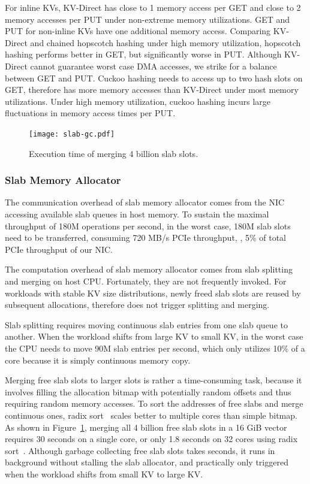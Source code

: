 For inline KVs, KV-Direct has close to 1 memory access per GET and close to 2 memory accesses per PUT under non-extreme memory utilizations.
GET and PUT for non-inline KVs have one additional memory access.
Comparing KV-Direct and chained hopscotch hashing under high memory utilization, hopscotch hashing performs better in GET, but significantly worse in PUT.
Although KV-Direct cannot guarantee worst case DMA accesses, we strike for a balance between GET and PUT.
Cuckoo hashing needs to access up to two hash slots on GET, therefore has more memory accesses than KV-Direct under most memory utilizations.
Under high memory utilization, cuckoo hashing incurs large fluctuations in memory access times per PUT.



\begin{figure}[t]
\centering
\texttt{[image: slab-gc.pdf]}
\caption{Execution time of merging 4 billion slab slots.}
\label{kvdirect:fig:slab-garbage-collection}

\end{figure}

\subsubsection{Slab Memory Allocator}
\label{kvdirect:sec:slab-eval}

The communication overhead of slab memory allocator comes from the NIC accessing available slab queues in host memory.
To sustain the maximal throughput of 180M operations per second, in the worst case, 180M slab slots need to be transferred, consuming 720 MB/s PCIe throughput, \ie, 5\% of total PCIe throughput of our NIC.

The computation overhead of slab memory allocator comes from slab splitting and merging on host CPU.
Fortunately, they are not frequently invoked.
For workloads with stable KV size distributions, newly freed slab slots are reused by subsequent allocations, therefore does not trigger splitting and merging.

Slab splitting requires moving continuous slab entries from one slab queue to another. When the workload shifts from large KV to small KV, in the worst case the CPU needs to move 90M slab entries per second, which only utilizes 10\% of a core because it is simply continuous memory copy.

Merging free slab slots to larger slots is rather a time-consuming task, because it involves filling the allocation bitmap with potentially random offsets and thus requiring random memory accesses.
To sort the addresses of free slabs and merge continuous ones, radix sort~\cite{satish2010fast} scales better to multiple cores than simple bitmap.
As shown in Figure~\ref{kvdirect:fig:slab-garbage-collection}, merging all 4 billion free slab slots in a 16 GiB vector requires 30 seconds on a single core, or only 1.8 seconds on 32 cores using radix sort~\cite{satish2010fast}.
Although garbage collecting free slab slots takes seconds, it runs in background without stalling the slab allocator, and practically only triggered when the workload shifts from small KV to large KV.

